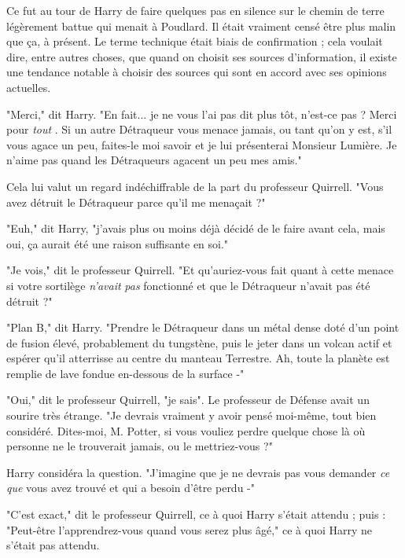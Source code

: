 Ce fut au tour de Harry de faire quelques pas en silence sur le chemin de terre légèrement battue qui menait à Poudlard. Il était vraiment censé être plus malin que ça, à présent. Le terme technique était biais de confirmation ; cela voulait dire, entre autres choses, que quand on choisit ses sources d'information, il existe une tendance notable à choisir des sources qui sont en accord avec ses opinions actuelles.

"Merci," dit Harry. "En fait... je ne vous l'ai pas dit plus tôt, n'est-ce pas ? Merci pour \emph{tout} . Si un autre Détraqueur vous menace jamais, ou tant qu'on y est, s'il vous agace un peu, faites-le moi savoir et je lui présenterai Monsieur Lumière. Je n'aime pas quand les Détraqueurs agacent un peu mes amis."

Cela lui valut un regard indéchiffrable de la part du professeur Quirrell. "Vous avez détruit le Détraqueur parce qu'il me menaçait ?"

"Euh," dit Harry, "j'avais plus ou moins déjà décidé de le faire avant cela, mais oui, ça aurait été une raison suffisante en soi."

"Je vois," dit le professeur Quirrell. "Et qu'auriez-vous fait quant à cette menace si votre sortilège \emph{n'avait}  \emph{pas}  fonctionné et que le Détraqueur n'avait pas été détruit ?"

"Plan B," dit Harry. "Prendre le Détraqueur dans un métal dense doté d'un point de fusion élevé, probablement du tungstène, puis le jeter dans un volcan actif et espérer qu'il atterrisse au centre du manteau Terrestre. Ah, toute la planète est remplie de lave fondue en-dessous de la surface -"

"Oui," dit le professeur Quirrell, "je sais". Le professeur de Défense avait un sourire très étrange. "Je devrais vraiment y avoir pensé moi-même, tout bien considéré. Dites-moi, M. Potter, si vous vouliez perdre quelque chose là où personne ne le trouverait jamais, ou le mettriez-vous ?"

Harry considéra la question. "J'imagine que je ne devrais pas vous demander \emph{ce que}  vous avez trouvé et qui a besoin d'être perdu -"

"C'est exact," dit le professeur Quirrell, ce à quoi Harry s'était attendu ; puis : "Peut-être l'apprendrez-vous quand vous serez plus âgé," ce à quoi Harry ne s'était pas attendu.

